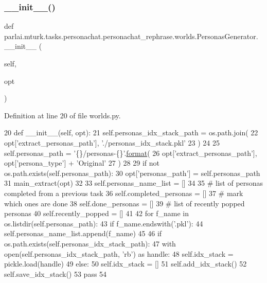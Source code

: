 \subsubsection{\texorpdfstring{\+\_\+\+\_\+init\+\_\+\+\_\+()}{\_\_init\_\_()}}
{\footnotesize\ttfamily def parlai.\+mturk.\+tasks.\+personachat.\+personachat\+\_\+rephrase.\+worlds.\+Personas\+Generator.\+\_\+\+\_\+init\+\_\+\+\_\+ (\begin{DoxyParamCaption}\item[{}]{self,  }\item[{}]{opt }\end{DoxyParamCaption})}



Definition at line 20 of file worlds.\+py.


\begin{DoxyCode}
20     \textcolor{keyword}{def }\_\_init\_\_(self, opt):
21         self.personas\_idx\_stack\_path = os.path.join(
22             opt[\textcolor{stringliteral}{'extract\_personas\_path'}], \textcolor{stringliteral}{'./personas\_idx\_stack.pkl'}
23         )
24 
25         self.personas\_path = \textcolor{stringliteral}{'\{\}/personas-\{\}'}.\hyperlink{namespaceparlai_1_1chat__service_1_1services_1_1messenger_1_1shared__utils_a32e2e2022b824fbaf80c747160b52a76}{format}(
26             opt[\textcolor{stringliteral}{'extract\_personas\_path'}], opt[\textcolor{stringliteral}{'persona\_type'}] + \textcolor{stringliteral}{'Original'}
27         )
28 
29         \textcolor{keywordflow}{if} \textcolor{keywordflow}{not} os.path.exists(self.personas\_path):
30             opt[\textcolor{stringliteral}{'personas\_path'}] = self.personas\_path
31             main\_extract(opt)
32 
33         self.personas\_name\_list = []
34 
35         \textcolor{comment}{# list of personas completed from a previous task}
36         self.completed\_personas = []
37         \textcolor{comment}{# mark which ones are done}
38         self.done\_personas = []
39         \textcolor{comment}{# list of recently popped personas}
40         self.recently\_popped = []
41 
42         \textcolor{keywordflow}{for} f\_name \textcolor{keywordflow}{in} os.listdir(self.personas\_path):
43             \textcolor{keywordflow}{if} f\_name.endswith(\textcolor{stringliteral}{'.pkl'}):
44                 self.personas\_name\_list.append(f\_name)
45 
46         \textcolor{keywordflow}{if} os.path.exists(self.personas\_idx\_stack\_path):
47             with open(self.personas\_idx\_stack\_path, \textcolor{stringliteral}{'rb'}) \textcolor{keyword}{as} handle:
48                 self.idx\_stack = pickle.load(handle)
49         \textcolor{keywordflow}{else}:
50             self.idx\_stack = []
51             self.add\_idx\_stack()
52             self.save\_idx\_stack()
53         \textcolor{keywordflow}{pass}
54 
\end{DoxyCode}


